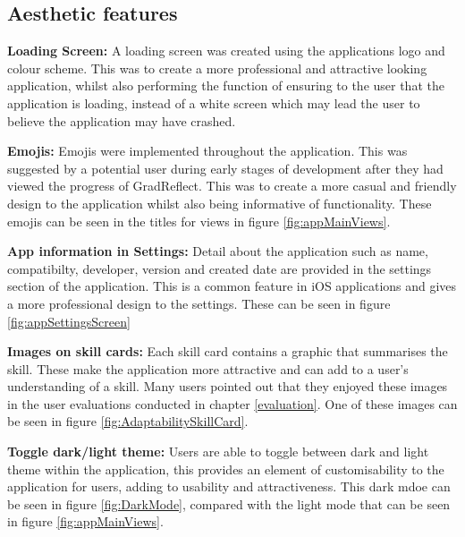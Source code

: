 \documentclass{l4proj}
\begin{document}
\subsection{Aesthetic features}

\textbf{Loading Screen:} A loading screen was created using the applications logo and colour scheme. This was to create a more professional and attractive looking application, whilst also performing the function of ensuring to the user that the application is loading, instead of a white screen which may lead the user to believe the application may have crashed.

\textbf{Emojis:} Emojis were implemented throughout the application. This was suggested by a potential user during early stages of development after they had viewed the progress of GradReflect. This was to create a more casual and friendly design to the application whilst also being informative of functionality. These emojis can be seen in the titles for views in figure \ref{fig:appMainViews}.

\textbf{App information in Settings:} Detail about the application such as name, compatibilty, developer, version and created date are provided in the settings section of the application. This is a common feature in iOS applications and gives a more professional design to the settings. These can be seen in figure \ref{fig:appSettingsScreen}

\textbf{Images on skill cards:} Each skill card contains a graphic that summarises the skill. These make the application more attractive and can add to a user's understanding of a skill. Many users pointed out that they enjoyed these images in the user evaluations conducted in chapter \ref{evaluation}. One of these images can be seen in figure \ref{fig:AdaptabilitySkillCard}.

\textbf{Toggle dark/light theme:} Users are able to toggle between dark and light theme within the application, this provides an element of customisability to the application for users, adding to usability and attractiveness. This dark mdoe can be seen in figure \ref{fig:DarkMode}, compared with the light mode that can be seen in figure \ref{fig:appMainViews}. 
\end{document}
